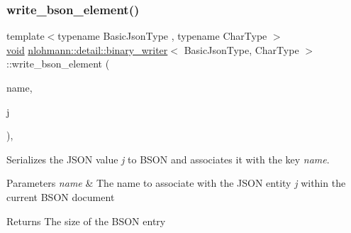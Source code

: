 \subsubsection{\texorpdfstring{write\+\_\+bson\+\_\+element()}{write\_bson\_element()}}
{\footnotesize\ttfamily template$<$typename Basic\+Json\+Type , typename Char\+Type $>$ \\
\hyperlink{namespacenlohmann_1_1detail_a59fca69799f6b9e366710cb9043aa77d}{void} \hyperlink{classnlohmann_1_1detail_1_1binary__writer}{nlohmann\+::detail\+::binary\+\_\+writer}$<$ Basic\+Json\+Type, Char\+Type $>$\+::write\+\_\+bson\+\_\+element (\begin{DoxyParamCaption}\item[{const \hyperlink{classnlohmann_1_1detail_1_1binary__writer_a29f2ae7a5c4a8c1dae47b3b2310de8a8}{string\+\_\+t} \&}]{name,  }\item[{const Basic\+Json\+Type \&}]{j }\end{DoxyParamCaption})\hspace{0.3cm}{\ttfamily [inline]}, {\ttfamily [private]}}



Serializes the J\+S\+ON value {\itshape j} to B\+S\+ON and associates it with the key {\itshape name}. 


\begin{DoxyParams}{Parameters}
{\em name} & The name to associate with the J\+S\+ON entity {\itshape j} within the current B\+S\+ON document \\
\hline
\end{DoxyParams}
\begin{DoxyReturn}{Returns}
The size of the B\+S\+ON entry 
\end{DoxyReturn}
\mbox{\label{classnlohmann_1_1detail_1_1binary__writer_a1b5b7f5c03b1f8b1f59ea61db9634108}} 
